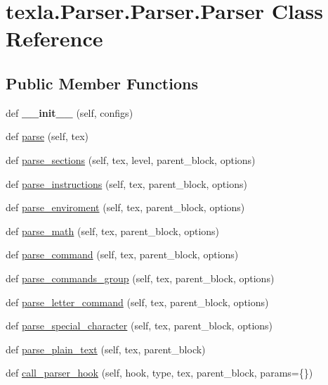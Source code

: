 \hypertarget{classtexla_1_1Parser_1_1Parser_1_1Parser}{}\section{texla.\+Parser.\+Parser.\+Parser Class Reference}
\label{classtexla_1_1Parser_1_1Parser_1_1Parser}
\subsection*{Public Member Functions}
\begin{DoxyCompactItemize}
\item 
\hypertarget{classtexla_1_1Parser_1_1Parser_1_1Parser_aa60009122c54ff992915770470fefbe8}{}\label{classtexla_1_1Parser_1_1Parser_1_1Parser_aa60009122c54ff992915770470fefbe8} 
def {\bfseries \+\_\+\+\_\+init\+\_\+\+\_\+} (self, configs)
\item 
def \hyperlink{classtexla_1_1Parser_1_1Parser_1_1Parser_afb55891b1d2f77a2e3aeeeb7f7e63550}{parse} (self, tex)
\item 
def \hyperlink{classtexla_1_1Parser_1_1Parser_1_1Parser_a7f65437398ebf3111c428747fdac9489}{parse\+\_\+sections} (self, tex, level, parent\+\_\+block, options)
\item 
def \hyperlink{classtexla_1_1Parser_1_1Parser_1_1Parser_a4c403acf107ba47795b70391db7e4bd4}{parse\+\_\+instructions} (self, tex, parent\+\_\+block, options)
\item 
def \hyperlink{classtexla_1_1Parser_1_1Parser_1_1Parser_ae5a596144e7be79cbca63d05dce99f06}{parse\+\_\+enviroment} (self, tex, parent\+\_\+block, options)
\item 
def \hyperlink{classtexla_1_1Parser_1_1Parser_1_1Parser_aee9adc1fcfa4c8194e37552124f67848}{parse\+\_\+math} (self, tex, parent\+\_\+block, options)
\item 
def \hyperlink{classtexla_1_1Parser_1_1Parser_1_1Parser_ac878c2e3e4690f9975ccf541b11796b5}{parse\+\_\+command} (self, tex, parent\+\_\+block, options)
\item 
def \hyperlink{classtexla_1_1Parser_1_1Parser_1_1Parser_a2ce55a1ea4d024ff77ce3a3718b76bbd}{parse\+\_\+commands\+\_\+group} (self, tex, parent\+\_\+block, options)
\item 
def \hyperlink{classtexla_1_1Parser_1_1Parser_1_1Parser_a66a08e68dd0a879d09ed5be4b41eb4b9}{parse\+\_\+letter\+\_\+command} (self, tex, parent\+\_\+block, options)
\item 
def \hyperlink{classtexla_1_1Parser_1_1Parser_1_1Parser_af4a46e7760e444cd77edf24053eb2cad}{parse\+\_\+special\+\_\+character} (self, tex, parent\+\_\+block, options)
\item 
def \hyperlink{classtexla_1_1Parser_1_1Parser_1_1Parser_af5273483c94bc329e6ec18d67967ce4a}{parse\+\_\+plain\+\_\+text} (self, tex, parent\+\_\+block)
\item 
def \hyperlink{classtexla_1_1Parser_1_1Parser_1_1Parser_a7fa931c1a8b0b570977fb5c311ea9ec0}{call\+\_\+parser\+\_\+hook} (self, hook, type, tex, parent\+\_\+block, params=\{\})
\end{DoxyCompactItemize}
